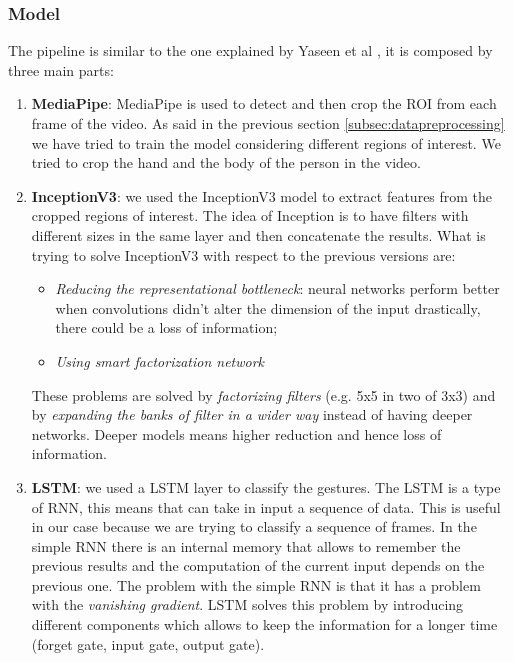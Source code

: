 \documentclass[10pt,twocolumn,letterpaper]{article}
\begin{document}
\subsubsection{Model}
The pipeline is similar to the one explained by Yaseen et al \cite{electronics13163233}, it is composed by three main parts:
\begin{enumerate}
   \item \textbf{MediaPipe}: MediaPipe is used to detect and then crop the ROI from each frame of the video.
   As said in the previous section \ref{subsec:datapreprocessing} we have tried to train the model considering 
   different regions of interest. We tried to crop the hand and the body of the person in the video. 
   \item \textbf{InceptionV3}: we used the InceptionV3 model \cite{szegedy2015rethinkinginceptionarchitecturecomputer} 
   to extract features from the cropped regions of interest.
   The idea of Inception is to have filters with different sizes in the same layer and then concatenate 
   the results. What is trying to solve InceptionV3 with respect to the previous versions are:
   \begin{itemize}
      \item \textit{Reducing the representational bottleneck}: neural networks perform better when convolutions
      didn't alter the dimension of the input drastically, there could be a loss of information;
      \item \textit{Using smart factorization network}
   \end{itemize}  
   These problems are solved by \textit{factorizing filters} (e.g. 5x5 in two of 3x3) and by \textit{expanding 
   the banks of filter in a wider way} instead of having deeper networks. 
   Deeper models means higher reduction and hence loss of information.
   \item \textbf{LSTM}: we used a LSTM layer to classify the gestures. 
   The LSTM is a type of RNN, this means that can take in input a sequence of data. This is useful in our case
   because we are trying to classify a sequence of frames. In the simple RNN there is an internal memory 
   that allows to remember the previous results and the computation of the current input depends on 
   the previous one. The problem with the simple RNN is that it has a problem with the \textit{vanishing gradient}.
   LSTM solves this problem by introducing different components which allows to keep the information 
   for a longer time (forget gate, input gate, output gate).
\end{enumerate}
\end{document}
